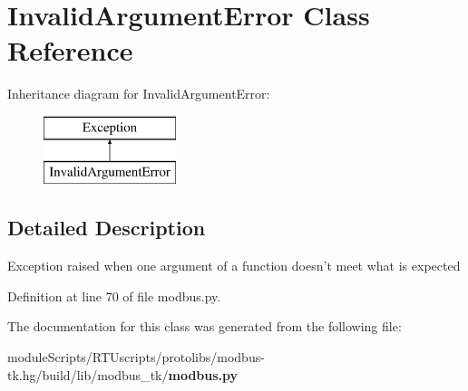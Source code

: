 \section{Invalid\+Argument\+Error Class Reference}
\label{classmodbus__tk_1_1modbus_1_1_invalid_argument_error}
Inheritance diagram for Invalid\+Argument\+Error\+:\begin{figure}[H]
\begin{center}
\leavevmode
\includegraphics[height=2.000000cm]{classmodbus__tk_1_1modbus_1_1_invalid_argument_error}
\end{center}
\end{figure}


\subsection{Detailed Description}
\begin{DoxyVerb}Exception raised when one argument of a function doesn't meet 
what is expected
\end{DoxyVerb}
 

Definition at line 70 of file modbus.\+py.



The documentation for this class was generated from the following file\+:\begin{DoxyCompactItemize}
\item 
module\+Scripts/\+R\+T\+Uscripts/protolibs/modbus-\/tk.\+hg/build/lib/modbus\+\_\+tk/{\bf modbus.\+py}\end{DoxyCompactItemize}
